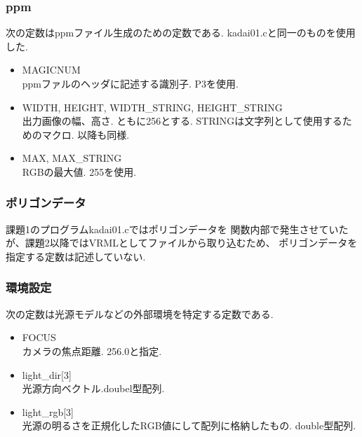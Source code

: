 \documentclass[a4j,dvipdfmx]{jsarticle}
\begin{document}
\subsubsection{ppm}
次の定数はppmファイル生成のための定数である.
kadai01.cと同一のものを使用した.
\begin{itemize}
\item MAGICNUM\\
  ppmファルのヘッダに記述する識別子. P3を使用.
  
\item WIDTH, HEIGHT, WIDTH\_STRING, HEIGHT\_STRING\\
  出力画像の幅、高さ. ともに256とする. STRINGは文字列として使用するためのマクロ.
  以降も同様.
  
\item MAX, MAX\_STRING\\
  RGBの最大値. 255を使用.

\end{itemize}

\subsubsection{ポリゴンデータ}
課題1のプログラムkadai01.cではポリゴンデータを
関数内部で発生させていたが、課題2以降ではVRMLとしてファイルから取り込むため、
ポリゴンデータを指定する定数は記述していない.

\subsubsection{環境設定}
次の定数は光源モデルなどの外部環境を特定する定数である.
\begin{itemize}
\item FOCUS\\
  カメラの焦点距離. 256.0と指定.
  
\item light\_dir[3]\\
  光源方向ベクトル.doubel型配列.
  
\item light\_rgb[3]\\
  光源の明るさを正規化したRGB値にして配列に格納したもの.
  double型配列.
  
\end{itemize}

\end{document}
